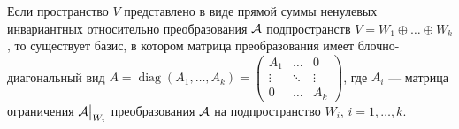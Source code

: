 \begin{corollary}
    Если пространство $V$ представлено в виде прямой суммы ненулевых инвариантных относительно преобразования $\mathcal{A}$ подпространств $V = W_1 \oplus \ldots \oplus W_k$, то существует базис, в котором матрица преобразования имеет блочно-диагональный вид
    $
        A = \operatorname{diag}(A_1, \ldots, A_k) =
        \begin{pmatrix}
            A_1 & \ldots & 0\\
            \vdots & \ddots & \vdots\\
            0 & \ldots & A_k
        \end{pmatrix}
    $, где $A_i$ --- матрица ограничения $\mathcal{A}\big|_{W_i}$ преобразования $\mathcal{A}$ на подпространство $W_i$, $i = 1, \ldots, k$.
\end{corollary}

